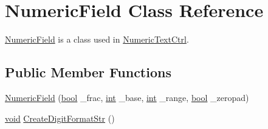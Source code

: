 \hypertarget{class_numeric_field}{}\section{Numeric\+Field Class Reference}
\label{class_numeric_field}


\hyperlink{class_numeric_field}{Numeric\+Field} is a class used in \hyperlink{class_numeric_text_ctrl}{Numeric\+Text\+Ctrl}.  


\subsection*{Public Member Functions}
\begin{DoxyCompactItemize}
\item 
\hyperlink{class_numeric_field_aeacab5cf3060c754c486af0c3d248423}{Numeric\+Field} (\hyperlink{mac_2config_2i386_2lib-src_2libsoxr_2soxr-config_8h_abb452686968e48b67397da5f97445f5b}{bool} \+\_\+frac, \hyperlink{xmltok_8h_a5a0d4a5641ce434f1d23533f2b2e6653}{int} \+\_\+base, \hyperlink{xmltok_8h_a5a0d4a5641ce434f1d23533f2b2e6653}{int} \+\_\+range, \hyperlink{mac_2config_2i386_2lib-src_2libsoxr_2soxr-config_8h_abb452686968e48b67397da5f97445f5b}{bool} \+\_\+zeropad)
\item 
\hyperlink{sound_8c_ae35f5844602719cf66324f4de2a658b3}{void} \hyperlink{class_numeric_field_a75f34a4a3c4f2eee3b761fd08ae9c068}{Create\+Digit\+Format\+Str} ()
\end{DoxyCompactItemize}
